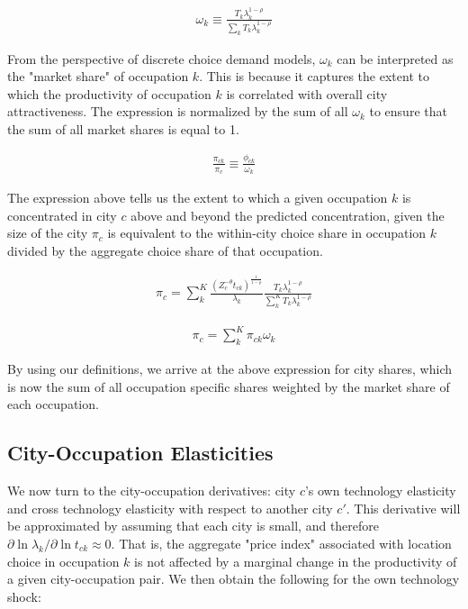 \documentclass[10pt]{article}
\begin{document}
\begin{align}
    \omega_k \equiv \frac{{T_{k}}\lambda_{k}^{1-\rho}}{\sum\limits_{k}{T_{k}}\lambda_{k}^{1-\rho}}
    \label{occupation_shares}
\end{align}

From the perspective of discrete choice demand models, $\omega_k$ can be interpreted as the "market share" of occupation $k$. This is because it captures the extent to which the productivity of occupation $k$ is correlated with overall city attractiveness. The expression is normalized by the sum of all $\omega_k$ to ensure that the sum of all market shares is equal to 1.

\begin{align}
    \frac{\pi_{ck}}{\pi_c}\equiv \frac{\phi_{ck}}{\omega_k}
    \label{identity}
\end{align}

The expression above tells us the extent to which a given occupation $k$ is concentrated in city $c$ above and beyond the predicted concentration, given the size of the city $\pi_c$ is equivalent to the within-city choice share in occupation $k$ divided by the aggregate choice share of that occupation.

\begin{align*}
    \pi_{c} = \sum_{k}^{K} \frac{(Z_{c}^{-\theta} t_{ck})^{\frac{1}{1-\rho}}}{\lambda_k} \frac{T_k \lambda_{k}^{1 - \rho}}{\sum \limits_{k}^{K} T_k \lambda_{k}^{1-\rho}}
\end{align*}

\begin{align}
    \pi_c = \sum_{k}^{K} \pi_{ck} \omega_k
\end{align}

By using our definitions, we arrive at the above expression for city shares, which is now the sum of all occupation specific shares weighted by the market share of each occupation.

\subsection{City-Occupation Elasticities}

We now turn to the city-occupation derivatives: city $c$'s own technology elasticity and cross technology elasticity with respect to another city $c'$. This derivative will be approximated by assuming that each city is small, and therefore $\partial \ln \lambda_k / \partial \ln t_{ck} \approx 0$. That is, the aggregate "price index" associated with location choice in occupation $k$ is not affected by a marginal change in the productivity of a given city-occupation pair. We then obtain the following for the own technology shock:
\end{document}
